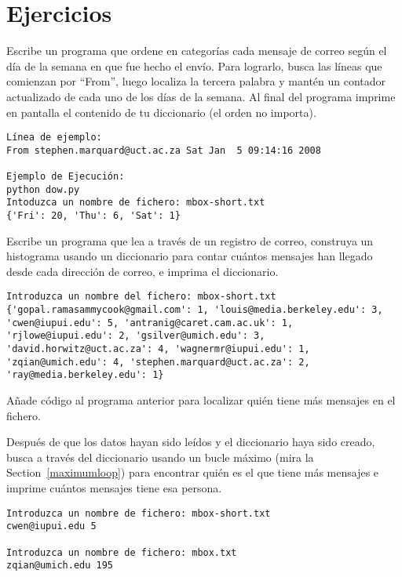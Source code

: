 \section{Ejercicios}

\begin{ex}
Escribe un programa que ordene en categorías cada mensaje de correo según
el día de la semana en que fue hecho el envío. Para lograrlo, busca
las líneas que comienzan por ``From'', luego localiza la
tercera palabra y mantén un contador actualizado de cada uno
de los días de la semana. Al final del programa imprime en pantalla
el contenido de tu diccionario (el orden no importa).

\beforeverb
\begin{verbatim}
Línea de ejemplo:
From stephen.marquard@uct.ac.za Sat Jan  5 09:14:16 2008

Ejemplo de Ejecución:
python dow.py
Intoduzca un nombre de fichero: mbox-short.txt
{'Fri': 20, 'Thu': 6, 'Sat': 1}
\end{verbatim}
\afterverb
\end{ex}

\begin{ex}
Escribe un programa que lea a través de un registro de correo,
construya un histograma usando un diccionario para contar cuántos
mensajes han llegado desde cada dirección de correo,
e imprima el diccionario.

\beforeverb
\begin{verbatim}
Introduzca un nombre del fichero: mbox-short.txt
{'gopal.ramasammycook@gmail.com': 1, 'louis@media.berkeley.edu': 3, 
'cwen@iupui.edu': 5, 'antranig@caret.cam.ac.uk': 1, 
'rjlowe@iupui.edu': 2, 'gsilver@umich.edu': 3, 
'david.horwitz@uct.ac.za': 4, 'wagnermr@iupui.edu': 1, 
'zqian@umich.edu': 4, 'stephen.marquard@uct.ac.za': 2, 
'ray@media.berkeley.edu': 1}
\end{verbatim}
\afterverb
\end{ex}

\begin{ex}
Añade código al programa anterior para localizar quién
tiene más mensajes en el fichero.

Después de que los datos hayan sido leídos y el diccionario haya
sido creado, busca a través del diccionario usando un bucle máximo
(mira la Section~\ref{maximumloop})
para encontrar quién es el que tiene más
mensajes e imprime cuántos mensajes tiene esa persona.

\beforeverb
\begin{verbatim}
Introduzca un nombre de fichero: mbox-short.txt
cwen@iupui.edu 5

Introduzca un nombre de fichero: mbox.txt
zqian@umich.edu 195
\end{verbatim}
\afterverb
\end{ex}

